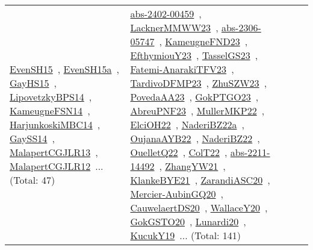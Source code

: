 {\begin{longtable}{lp{3cm}>{\raggedright\arraybackslash}p{6cm}>{\raggedright\arraybackslash}p{6cm}>{\raggedright\arraybackslash}p{8cm}}
\href{../works/EvenSH15.pdf}{EvenSH15}~\cite{EvenSH15}, \href{../works/EvenSH15a.pdf}{EvenSH15a}~\cite{EvenSH15a}, \href{../works/GayHS15.pdf}{GayHS15}~\cite{GayHS15}, \href{../works/LipovetzkyBPS14.pdf}{LipovetzkyBPS14}~\cite{LipovetzkyBPS14}, \href{../works/KameugneFSN14.pdf}{KameugneFSN14}~\cite{KameugneFSN14}, \href{../works/HarjunkoskiMBC14.pdf}{HarjunkoskiMBC14}~\cite{HarjunkoskiMBC14}, \href{../works/GaySS14.pdf}{GaySS14}~\cite{GaySS14}, \href{../works/MalapertCGJLR13.pdf}{MalapertCGJLR13}~\cite{MalapertCGJLR13}, \href{../works/MalapertCGJLR12.pdf}{MalapertCGJLR12}~\cite{MalapertCGJLR12}... (Total: 47) & \href{../works/abs-2402-00459.pdf}{abs-2402-00459}~\cite{abs-2402-00459}, \href{../works/LacknerMMWW23.pdf}{LacknerMMWW23}~\cite{LacknerMMWW23}, \href{../works/abs-2306-05747.pdf}{abs-2306-05747}~\cite{abs-2306-05747}, \href{../works/KameugneFND23.pdf}{KameugneFND23}~\cite{KameugneFND23}, \href{../works/EfthymiouY23.pdf}{EfthymiouY23}~\cite{EfthymiouY23}, \href{../works/TasselGS23.pdf}{TasselGS23}~\cite{TasselGS23}, \href{../works/Fatemi-AnarakiTFV23.pdf}{Fatemi-AnarakiTFV23}~\cite{Fatemi-AnarakiTFV23}, \href{../works/TardivoDFMP23.pdf}{TardivoDFMP23}~\cite{TardivoDFMP23}, \href{../works/ZhuSZW23.pdf}{ZhuSZW23}~\cite{ZhuSZW23}, \href{../works/PovedaAA23.pdf}{PovedaAA23}~\cite{PovedaAA23}, \href{../works/GokPTGO23.pdf}{GokPTGO23}~\cite{GokPTGO23}, \href{../works/AbreuPNF23.pdf}{AbreuPNF23}~\cite{AbreuPNF23}, \href{../works/MullerMKP22.pdf}{MullerMKP22}~\cite{MullerMKP22}, \href{../works/ElciOH22.pdf}{ElciOH22}~\cite{ElciOH22}, \href{../works/NaderiBZ22a.pdf}{NaderiBZ22a}~\cite{NaderiBZ22a}, \href{../works/OujanaAYB22.pdf}{OujanaAYB22}~\cite{OujanaAYB22}, \href{../works/NaderiBZ22.pdf}{NaderiBZ22}~\cite{NaderiBZ22}, \href{../works/OuelletQ22.pdf}{OuelletQ22}~\cite{OuelletQ22}, \href{../works/ColT22.pdf}{ColT22}~\cite{ColT22}, \href{../works/abs-2211-14492.pdf}{abs-2211-14492}~\cite{abs-2211-14492}, \href{../works/ZhangYW21.pdf}{ZhangYW21}~\cite{ZhangYW21}, \href{../works/KlankeBYE21.pdf}{KlankeBYE21}~\cite{KlankeBYE21}, \href{../works/ZarandiASC20.pdf}{ZarandiASC20}~\cite{ZarandiASC20}, \href{../works/Mercier-AubinGQ20.pdf}{Mercier-AubinGQ20}~\cite{Mercier-AubinGQ20}, \href{../works/CauwelaertDS20.pdf}{CauwelaertDS20}~\cite{CauwelaertDS20}, \href{../works/WallaceY20.pdf}{WallaceY20}~\cite{WallaceY20}, \href{../works/GokGSTO20.pdf}{GokGSTO20}~\cite{GokGSTO20}, \href{../works/Lunardi20.pdf}{Lunardi20}~\cite{Lunardi20}, \href{../works/KucukY19.pdf}{KucukY19}~\cite{KucukY19}... (Total: 141)\\

\end{longtable}}
